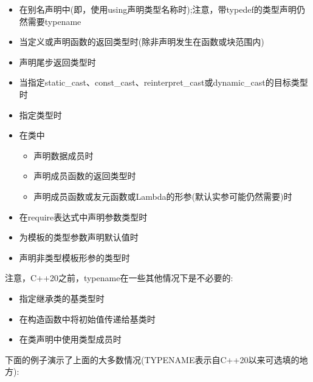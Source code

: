 \begin{itemize}
\item
在别名声明中(即，使用using声明类型名称时);注意，带typedef的类型声明仍然需要typename

\item
当定义或声明函数的返回类型时(除非声明发生在函数或块范围内)

\item
声明尾步返回类型时

\item
当指定static\_cast、const\_cast、reinterpret\_cast或dynamic\_cast的目标类型时

\item
指定类型时

\item
在类中

\begin{itemize}
\item
声明数据成员时

\item
声明成员函数的返回类型时

\item
声明成员函数或友元函数或Lambda的形参(默认实参可能仍然需要)时
\end{itemize}

\item
在require表达式中声明参数类型时

\item
为模板的类型参数声明默认值时

\item
声明非类型模板形参的类型时
\end{itemize}

注意，C++20之前，typename在一些其他情况下是不必要的:

\begin{itemize}
\item
指定继承类的基类型时

\item
在构造函数中将初始值传递给基类时

\item
在类声明中使用类型成员时
\end{itemize}

下面的例子演示了上面的大多数情况(TYPENAME表示自C++20以来可选填的地方):


